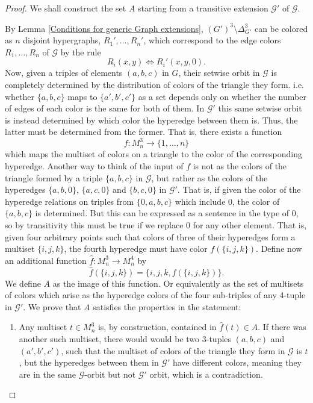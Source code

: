 \documentclass{amsart}
\def\graph{\mathcal{G}}
\newcommand{\set}[1]{\{#1 \}}
\begin{document}
\begin{proof}
    We shall construct the set $A$ starting from a transitive extension $\graph'$ of $\graph$.

    By Lemma \ref{Conditions for generic Graph extensions}, $(G')^3\setminus \Delta_{G '}^3$ can be colored as $n$ disjoint hypergraphs, $R_1', \dots, R_n'$, which correspond to the edge colors $R_1, \dots, R_n$ of $\graph$ by the rule
    $$R_i(x,y) \Longleftrightarrow R_i'(x,y, 0).$$
    Now, given a triples of elements $(a,b,c)$ in ${G}$, their setwise orbit in $\graph$ is completely determined by the distribution of colors of the triangle they form. i.e. whether $\set{a,b,c}$ maps to $\set{a', b', c'}$ as a set depends only on whether the number of edges of each color is the same for both of them. In $\graph'$ this same setwise orbit is instead determined by which color the hyperedge between them is. Thus, the latter must be determined from the former. That is, there exists a function
    $$f : M_n^3 \rightarrow \set{1, \dots,n}$$
    which maps the multiset of colors on a triangle to the color of the corresponding hyperedge. Another way to think of the input of $f$ is not as the colors of the triangle formed by a triple $\{a,b,c\}$ in $\graph$, but rather as the colors of the hyperedges $\{a, b, 0\}$, $\{a, c, 0\}$ and $\{b, c, 0\}$ in $\graph'$. That is, if given the color of the hyperedge relations on triples from $\set{0, a,b,c}$ which include $0$, the color of $\{a,b,c\}$ is determined. But this can be expressed as a sentence in the type of $0$, so by transitivity this must be true if we replace $0$ for any other element. That is, given four arbitrary points such that colors of three of their hyperedges form a multiset $\set{i, j, k}$, the fourth hyperedge must have color $f(\set{i, j, k})$. Define now an additional function $\hat{f}: M_n^3 \rightarrow M_n^4$ by
    $$\hat{f}(\set{i,j,k}) = \set{i, j, k, {f}(\set{i,j,k})}.$$
    We define $A$ as the image of this function. Or equivalently as the set of multisets of colors which arise as the hyperedge colors of the four sub-triples of any 4-tuple in $\graph'$. We prove that $A$ satisfies the properties in the statement:
    \begin{enumerate}
        \item Any multiset $t \in M_n^3$ is, by construction, contained in $\hat f(t) \in A$. If there was another such multiset, there would would be two 3-tuples $(a,b,c)$ and $(a', b', c')$, such that the multiset of colors of the triangle they form in $\graph$ is $t$, but the hyperedges between them in $\graph'$ have different colors, meaning they are in the same $\graph$-orbit but not $\graph'$ orbit, which is a contradiction.


\end{enumerate}
\end{proof}
\end{document}

